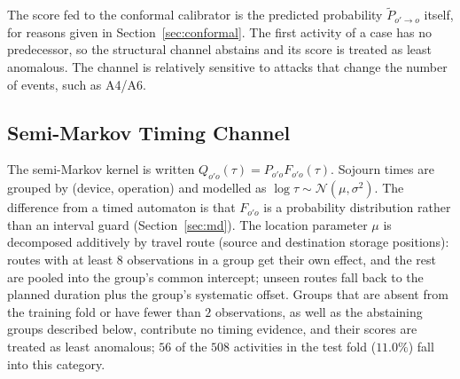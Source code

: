 \documentclass[manuscript,screen,review]{acmart}
\begin{document}
The score fed to the conformal calibrator is the predicted probability $\tilde P_{o'\to o}$ itself, for reasons given in Section~\ref{sec:conformal}. The first activity of a case has no predecessor, so the structural channel abstains and its score is treated as least anomalous. The channel is relatively sensitive to attacks that change the number of events, such as {A4}/{A6}.

\subsection{Semi-Markov Timing Channel}
\label{sec:timing}

The semi-Markov kernel is written $Q_{o'o}(\tau)=P_{o'o}F_{o'o}(\tau)$. Sojourn times are grouped by (device, operation) and modelled as $\log\tau\sim\mathcal{N}(\mu,\sigma^2)$. The difference from a timed automaton is that $F_{o'o}$ is a probability distribution rather than an interval guard (Section~\ref{sec:md}). The location parameter $\mu$ is decomposed additively by travel route (source and destination storage positions): routes with at least $8$ observations in a group get their own effect, and the rest are pooled into the group's common intercept; unseen routes fall back to the planned duration plus the group's systematic offset. Groups that are absent from the training fold or have fewer than $2$ observations, as well as the abstaining groups described below, contribute no timing evidence, and their scores are treated as least anomalous; $56$ of the $508$ activities in the test fold ($11.0\%$) fall into this category.
\end{document}
